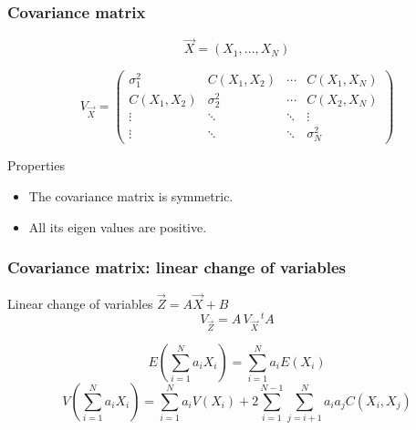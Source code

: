 \documentclass[9pt]{beamer}
\begin{document}
\begin{frame}
 \frametitle{Covariance matrix}
 
 \begin{block}{}
  $$\vec{X} = (X_1, \dots, X_N)$$
  
  $$V_{\vec{X}} = \begin{pmatrix}
                   \sigma_1^2 & C(X_1,X_2) & \cdots & C(X_1,X_N) \\
                   C(X_1,X_2) & \sigma_2^2 & \cdots & C(X_2,X_N) \\
                   \vdots & \ddots & \ddots &  \vdots \\
                   \vdots & \ddots & \ddots &  \sigma_N^2
                   \end{pmatrix}
$$
 \end{block}
 
 \begin{block}{Properties}
  \begin{itemize}
   \item The covariance matrix is symmetric.
   \item All its eigen values are positive.
  \end{itemize}

 \end{block}

\end{frame}

\begin{frame}
 \frametitle{Covariance matrix: linear change of variables}
 
 \begin{block}{Linear change of variables $\vec{Z} = A \vec{X} + B$}
  $$V_{\vec{Z}} = A\, V_{\vec{X}}\, ^t A$$
 \end{block}
 
 \begin{block}{}
  $$E \left( \sum_{i=1}^{N} a_i X_i \right) = \sum_{i=1}^{N} a_i E(X_i)$$
  $$V \left( \sum_{i=1}^{N} a_i X_i \right) = \sum_{i=1}^{N} a_i V(X_i) + 2 \sum_{i=1}^{N-1} \sum_{j=i+1}^{N} a_i a_j C(X_i,X_j)$$
 \end{block}
 
 \end{frame}
 
\end{document}
